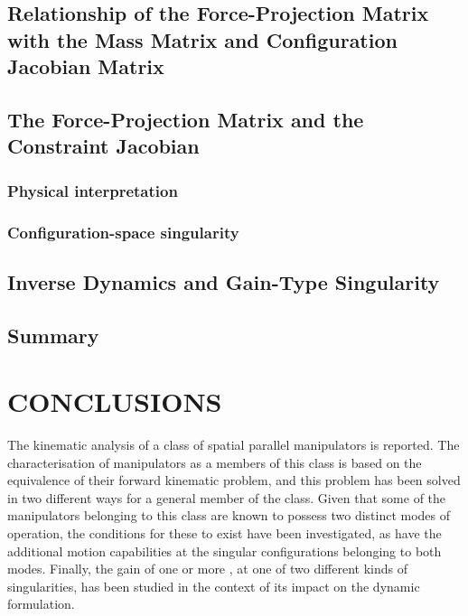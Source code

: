 \documentclass[DD]{iitmdiss}
\newcommand{\mlabel}[1]{\label{#1}}
\newcommand{\sg}[1]{\emph{\color{blue} [SG: #1]}}
\begin{document}
\section{Relationship of the Force-Projection Matrix with the Mass Matrix and Configuration Jacobian Matrix}\label{sc:matrels}
%
%
\section{The Force-Projection Matrix and the Constraint Jacobian} \label{ssc:BandJ}
%
\subsection{Physical interpretation} \label{ssc:Bphys}
%
\subsection{Configuration-space singularity}
%
\section{Inverse Dynamics and Gain-Type Singularity}\label{sc:gainsing}
%
\section{Summary}%
%
%
\chapter{CONCLUSIONS}\mlabel{ch:conc}
%
The kinematic analysis of a class of spatial parallel manipulators is reported. The characterisation of manipulators as a members of this class is based on the equivalence of their forward kinematic problem, and this problem has been solved in two different ways for a general member of the class. Given that some of the manipulators belonging to this class are known to possess two distinct modes of operation, the conditions for these to exist have been investigated, as have the additional motion capabilities at the singular configurations belonging to both modes. Finally, the gain of one or more \dofs, at one of two different kinds of singularities, has been studied in the context of its impact on the dynamic formulation.
\end{document}
